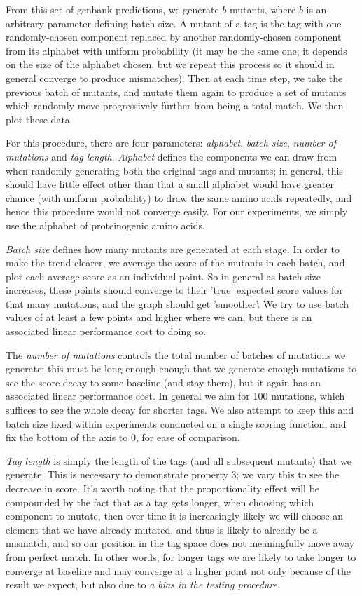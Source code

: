 \documentclass{l4proj}
\begin{document}
From this set of genbank predictions, we generate \(b\) mutants, where \(b\) is an arbitrary parameter defining batch size.  A mutant of a tag is the tag with one randomly-chosen component replaced by another randomly-chosen component from its alphabet with uniform probability (it may be the same one; it depends on the size of the alphabet chosen, but we repeat this process so it should in general converge to produce mismatches). Then at each time step, we take the previous batch of mutants, and mutate them again to produce a set of mutants which randomly move progressively further from being a total match. We then plot these data. 

For this procedure, there are four parameters: \textit{alphabet}, \textit{batch size}, \textit{number of mutations} and \textit{tag length}. \textit{Alphabet} defines the components we can draw from when randomly generating both the original tags and mutants; in general, this should have little effect other than that a small alphabet would have greater chance (with uniform probability) to draw the same amino acids repeatedly, and hence this procedure would not converge easily. For our experiments, we simply use the alphabet of proteinogenic amino acids.

\textit{Batch size} defines how many mutants are generated at each stage. In order to make the trend clearer, we average the score of the mutants in each batch, and plot each average score as an individual point. So in general as batch size increases, these points should converge to their 'true' expected score values for that many mutations, and the graph should get 'smoother'. We try to use batch values of at least a few points and higher where we can, but there is an associated linear performance cost to doing so.

The \textit{number of mutations} controls the total number of batches of mutations we generate; this must be long enough enough that we generate enough mutations to see the score decay to some baseline (and stay there), but it again has an associated linear performance cost. In general we aim for 100 mutations, which suffices to see the whole decay for shorter tags. We also attempt to keep this and batch size fixed within experiments conducted on a single scoring function, and fix the bottom of the axis to 0, for ease of comparison.

\textit{Tag length} is simply the length of the tags (and all subsequent mutants) that we generate. This is necessary to demonstrate property 3; we vary this to see the decrease in score. It's worth noting that the proportionality effect will be compounded by the fact that as a tag gets longer, when choosing which component to mutate, then over time it is increasingly likely we will choose an element that we have already mutated, and thus is likely to already be a mismatch, and so our position in the tag space does not meaningfully move away from perfect match. In other words, for longer tags we are likely to take longer to converge at baseline and may converge at a higher point not only because of the result we expect, but also due to \textit{a bias in the testing procedure}. 
\end{document}
